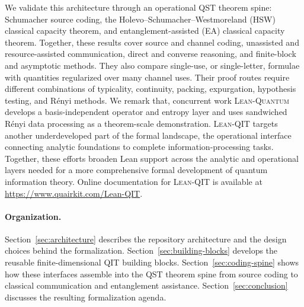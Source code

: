 \documentclass[10pt,a4paper]{article}
\DeclareRobustCommand{\LeanQIT}{\textnormal{\textsc{Lean-QIT}}}
\DeclareRobustCommand{\LeanQuantum}{\textnormal{\textsc{Lean-Quantum}}}
\begin{document}
We validate this architecture through an operational QST theorem spine: Schumacher source coding, the Holevo--Schumacher--Westmoreland (HSW) classical capacity theorem, and entanglement-assisted (EA) classical capacity theorem. Together, these results cover source and channel coding, unassisted and resource-assisted communication, direct and converse reasoning, and finite-block and asymptotic methods. They also compare single-use, or single-letter, formulae with quantities regularized over many channel uses. Their proof routes require different combinations of typicality, continuity, packing, expurgation, hypothesis testing, and R\'enyi methods. We remark that, concurrent work \LeanQuantum{}~\cite{Kasaura2026LeanQuantum} develops a basis-independent operator and entropy layer and uses sandwiched R\'enyi data processing as a theorem-scale demonstration.  \LeanQIT{} targets another underdeveloped part of the formal landscape, the operational interface connecting analytic foundations to complete information-processing tasks. Together, these efforts broaden Lean support across the analytic and operational layers needed for a more comprehensive formal development of quantum information theory. Online documentation for \LeanQIT{} is available at \url{https://www.quairkit.com/Lean-QIT}.

	
\paragraph{Organization.}
Section~\ref{sec:architecture} describes the repository architecture and the design choices behind the formalization.  Section~\ref{sec:building-blocks} develops the reusable finite-dimensional QIT building blocks. Section~\ref{sec:coding-spine} shows how these interfaces assemble into the QST theorem spine from source coding to classical communication and entanglement assistance.  Section~\ref{sec:conclusion} discusses the resulting formalization agenda.
\end{document}

